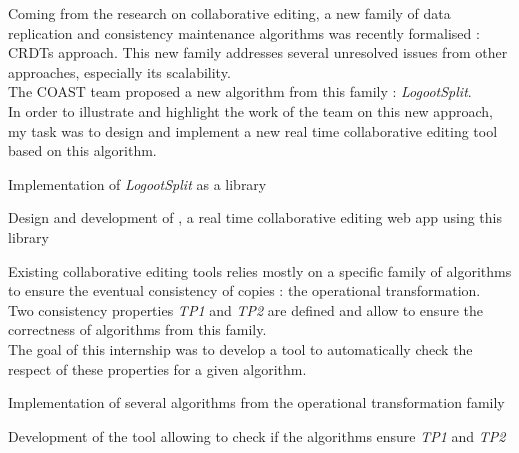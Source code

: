 \documentclass[]{deedy-resume-openfont}
\begin{document}
\hfill\begin{minipage}{\dimexpr\textwidth-0.5cm}
Coming from the research on collaborative editing, a new family of data replication and consistency maintenance algorithms
was recently formalised : \acfp{CRDT} approach.
This new family addresses several unresolved issues from other approaches, especially its scalability.
\\
The COAST team proposed a new algorithm from this family : \emph{LogootSplit}.
\\
In order to illustrate and highlight the work of the team on this new approach,
my task was to design and implement a new real time collaborative editing tool based on this algorithm.
\begin{tightemize}
\item Implementation of \emph{LogootSplit} as a library
\item Design and development of \href{https://www.coedit.re}{}, a real time collaborative editing web app using this library
\end{tightemize}
\sectionsep\xdef\tpd{\the\prevdepth}
\end{minipage}

\sectionsep

\hfill\begin{minipage}{\dimexpr\textwidth-0.5cm}
Existing collaborative editing tools relies mostly on a specific family of algorithms
to ensure the eventual consistency of copies : the operational transformation.
\\
Two consistency properties \emph{TP1} and \emph{TP2} are defined and allow to ensure the correctness of algorithms from this family.
\\
The goal of this internship was to develop a tool to automatically check the respect of these properties for a given algorithm.
\begin{tightemize}
\item Implementation of several algorithms from the operational transformation family
\item Development of the tool allowing to check if the algorithms ensure \emph{TP1} and \emph{TP2}
\end{tightemize}
\sectionsep\xdef\tpd{\the\prevdepth}
\end{minipage}
\end{document}
